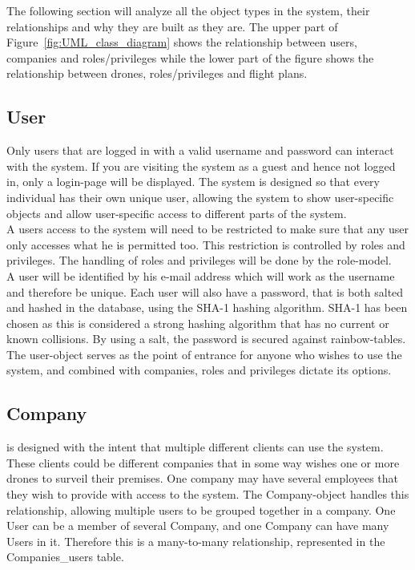 The following section will analyze all the object types in the system, their relationships and why they are built as they are.
The upper part of Figure~\ref{fig:UML_class_diagram} shows the relationship between users, companies and roles/privileges while the lower part of the figure shows the relationship between drones, roles/privileges and flight plans.


\subsection{User}
Only users that are logged in with a valid username and password can interact with the system.
If you are visiting the system as a guest and hence not logged in, only a login-page will be displayed.
The system is designed so that every individual has their own unique user, allowing the system to show user-specific objects and allow user-specific access to different parts of the system. \\

A users access to the system will need to be restricted to make sure that any user only accesses what he is permitted too.
This restriction is controlled by roles and privileges.
The handling of roles and privileges will be done by the role-model. \\

A user will be identified by his e-mail address which will work as the username and therefore be unique.
Each user will also have a password, that is both salted and hashed in the database, using the SHA-1 hashing algorithm. SHA-1 has been chosen as this is considered a strong hashing algorithm that has no current or known collisions. By using a salt, the password is secured against rainbow-tables.  \\

The user-object serves as the point of entrance for anyone who wishes to use the system, and combined with companies, roles and privileges dictate its options.


\subsection{Company}
\projectname{} is designed with the intent that multiple different clients can use the system.
These clients could be different companies that in some way wishes one or more drones to surveil their premises.
One company may have several employees that they wish to provide with access to the system.
The Company-object handles this relationship, allowing multiple users to be grouped together in a company.
One User can be a member of several Company, and one Company can have many Users in it.
Therefore this is a many-to-many relationship, represented in the Companies\_users table. \\

